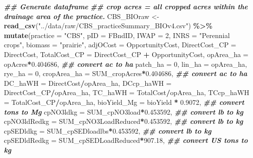 \documentclass[
]{article}
\newenvironment{Shaded}{\begin{snugshade}}{\end{snugshade}}
\newcommand{\AttributeTok}[1]{\textcolor[rgb]{0.13,0.29,0.53}{#1}}
\newcommand{\DecValTok}[1]{\textcolor[rgb]{0.00,0.00,0.81}{#1}}
\newcommand{\DocumentationTok}[1]{\textcolor[rgb]{0.56,0.35,0.01}{\textbf{\textit{#1}}}}
\newcommand{\FloatTok}[1]{\textcolor[rgb]{0.00,0.00,0.81}{#1}}
\newcommand{\FunctionTok}[1]{\textcolor[rgb]{0.13,0.29,0.53}{\textbf{#1}}}
\newcommand{\NormalTok}[1]{#1}
\newcommand{\OtherTok}[1]{\textcolor[rgb]{0.56,0.35,0.01}{#1}}
\newcommand{\SpecialCharTok}[1]{\textcolor[rgb]{0.81,0.36,0.00}{\textbf{#1}}}
\newcommand{\StringTok}[1]{\textcolor[rgb]{0.31,0.60,0.02}{#1}}
\begin{document}
\begin{Shaded}
\begin{Highlighting}[]
\DocumentationTok{\#\# Generate dataframe}
\DocumentationTok{\#\# crop acres = all cropped acres within the drainage area of the practice.}
\NormalTok{CBS\_BIOraw }\OtherTok{\textless{}{-}} \FunctionTok{read\_csv}\NormalTok{(}\StringTok{"../data/raw/CBS\_practiceSummary\_BIOv4.csv"}\NormalTok{) }\SpecialCharTok{\%\textgreater{}\%}
  \FunctionTok{mutate}\NormalTok{(}\AttributeTok{practice =} \StringTok{"CBS"}\NormalTok{,}
         \AttributeTok{pID =}\NormalTok{ FBndID,}
         \AttributeTok{IWAP =} \DecValTok{2}\NormalTok{,}
         \AttributeTok{INRS =} \StringTok{"Perennial crops"}\NormalTok{,}
         \AttributeTok{biomass =} \StringTok{"prairie"}\NormalTok{,}
         \AttributeTok{adjOCost =}\NormalTok{ OpportunityCost,}
         \AttributeTok{DirectCost\_CP =}\NormalTok{ DirectCost,}
         \AttributeTok{TotalCost\_CP =}\NormalTok{ DirectCost\_CP }\SpecialCharTok{+}\NormalTok{ OpportunityCost,}
         \AttributeTok{opArea\_ha =}\NormalTok{ opAcres}\SpecialCharTok{*}\FloatTok{0.404686}\NormalTok{, }\DocumentationTok{\#\# convert ac to ha}
         \AttributeTok{patch\_ha =} \DecValTok{0}\NormalTok{,}
         \AttributeTok{lin\_ha =}\NormalTok{ opArea\_ha,}
         \AttributeTok{rye\_ha =} \DecValTok{0}\NormalTok{,}
         \AttributeTok{cropArea\_ha =}\NormalTok{ SUM\_cropAcres}\SpecialCharTok{*}\FloatTok{0.404686}\NormalTok{, }\DocumentationTok{\#\# convert ac to ha}
         \AttributeTok{DC\_haWH =}\NormalTok{ DirectCost}\SpecialCharTok{/}\NormalTok{opArea\_ha,}
         \AttributeTok{DCcp\_haWH =}\NormalTok{ DirectCost\_CP}\SpecialCharTok{/}\NormalTok{opArea\_ha,}
         \AttributeTok{TC\_haWH =}\NormalTok{ TotalCost}\SpecialCharTok{/}\NormalTok{opArea\_ha,}
         \AttributeTok{TCcp\_haWH =}\NormalTok{ TotalCost\_CP}\SpecialCharTok{/}\NormalTok{opArea\_ha,}
         \AttributeTok{bioYield\_Mg =}\NormalTok{ bioYield }\SpecialCharTok{*} \FloatTok{0.9072}\NormalTok{, }\DocumentationTok{\#\# convert tons to Mg}
         \AttributeTok{cpNO3ldkg =}\NormalTok{ SUM\_cpNO3load}\SpecialCharTok{*}\FloatTok{0.453592}\NormalTok{, }\DocumentationTok{\#\# convert lb to kg}
         \AttributeTok{cpNO3ldRedkg =}\NormalTok{ SUM\_cpNO3LoadReduced}\SpecialCharTok{*}\FloatTok{0.453592}\NormalTok{, }\DocumentationTok{\#\# convert lb to kg}
         \AttributeTok{cpSEDldkg =}\NormalTok{ SUM\_cpSEDloadlbs}\SpecialCharTok{*}\FloatTok{0.453592}\NormalTok{, }\DocumentationTok{\#\# convert lb to kg}
         \AttributeTok{cpSEDldRedkg =}\NormalTok{ SUM\_cpSEDLoadReduced}\SpecialCharTok{*}\FloatTok{907.18}\NormalTok{, }\DocumentationTok{\#\# convert US tons to kg}

\end{Highlighting}
\end{Shaded}
\end{document}
